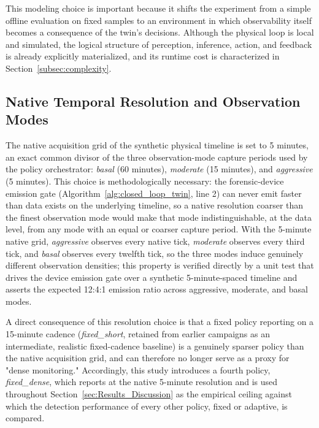\documentclass{ieeeaccess}
\begin{document}
This modeling choice is important because it shifts the experiment from a simple offline evaluation on fixed samples to an environment in which observability itself becomes a consequence of the twin's decisions. Although the physical loop is local and simulated, the logical structure of perception, inference, action, and feedback is already explicitly materialized, and its runtime cost is characterized in Section~\ref{subsec:complexity}.

\subsection{Native Temporal Resolution and Observation Modes}
\label{subsec:native_resolution}
The native acquisition grid of the synthetic physical timeline is set to 5 minutes, an exact common divisor of the three observation-mode capture periods used by the policy orchestrator: \textit{basal} (60 minutes), \textit{moderate} (15 minutes), and \textit{aggressive} (5 minutes). This choice is methodologically necessary: the forensic-device emission gate (Algorithm~\ref{alg:closed_loop_twin}, line 2) can never emit faster than data exists on the underlying timeline, so a native resolution coarser than the finest observation mode would make that mode indistinguishable, at the data level, from any mode with an equal or coarser capture period. With the 5-minute native grid, \textit{aggressive} observes every native tick, \textit{moderate} observes every third tick, and \textit{basal} observes every twelfth tick, so the three modes induce genuinely different observation densities; this property is verified directly by a unit test that drives the device emission gate over a synthetic 5-minute-spaced timeline and asserts the expected 12:4:1 emission ratio across aggressive, moderate, and basal modes.

A direct consequence of this resolution choice is that a fixed policy reporting on a 15-minute cadence (\textit{fixed\_short}, retained from earlier campaigns as an intermediate, realistic fixed-cadence baseline) is a genuinely sparser policy than the native acquisition grid, and can therefore no longer serve as a proxy for "dense monitoring." Accordingly, this study introduces a fourth policy, \textit{fixed\_dense}, which reports at the native 5-minute resolution and is used throughout Section~\ref{sec:Results_Discussion} as the empirical ceiling against which the detection performance of every other policy, fixed or adaptive, is compared.
\end{document}
